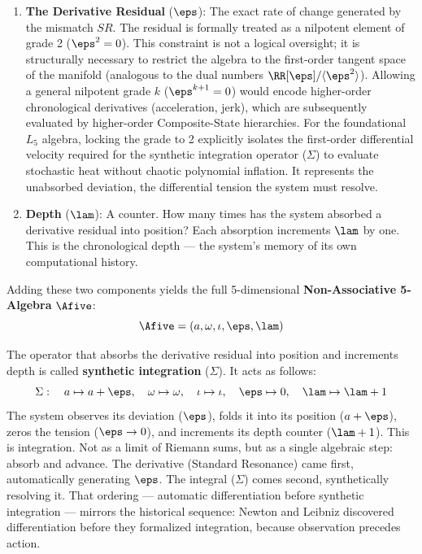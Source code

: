 \begin{enumerate}
\item \textbf{The Derivative Residual} ($\eps$): The exact rate of change generated by the mismatch $SR$. The residual is formally treated as a nilpotent element of grade 2 ($\eps^2 = 0$). This constraint is not a logical oversight; it is structurally necessary to restrict the algebra to the first-order tangent space of the manifold (analogous to the dual numbers $\RR[\eps]/\langle\eps^2\rangle$). Allowing a general nilpotent grade $k$ ($\eps^{k+1} = 0$) would encode higher-order chronological derivatives (acceleration, jerk), which are subsequently evaluated by higher-order Composite-State hierarchies. For the foundational $L_5$ algebra, locking the grade to 2 explicitly isolates the first-order differential velocity required for the synthetic integration operator ($\Sigma$) to evaluate stochastic heat without chaotic polynomial inflation. It represents the unabsorbed deviation, the differential tension the system must resolve. 
\item \textbf{Depth} ($\lam$): A counter. How many times has the system absorbed a derivative residual into position? Each absorption increments $\lam$ by one. This is the chronological depth --- the system's memory of its own computational history.
\end{enumerate}

Adding these two components yields the full 5-dimensional \textbf{Non-Associative 5-Algebra} $\Afive$:
$$\Afive = (a, \omega, \iota, \eps, \lam)$$

The operator that absorbs the derivative residual into position and increments depth is called \textbf{synthetic integration} ($\Sigma$). It acts as follows:
$$\Sigma: \quad a \mapsto a + \eps, \quad \omega \mapsto \omega, \quad \iota \mapsto \iota, \quad \eps \mapsto 0, \quad \lam \mapsto \lam + 1$$
The system observes its deviation ($\eps$), folds it into its position ($a + \eps$), zeros the tension ($\eps \to 0$), and increments its depth counter ($\lam + 1$). This is integration. Not as a limit of Riemann sums, but as a single algebraic step: absorb and advance. The derivative (Standard Resonance) came first, automatically generating $\eps$. The integral ($\Sigma$) comes second, synthetically resolving it. That ordering --- automatic differentiation before synthetic integration --- mirrors the historical sequence: Newton and Leibniz discovered differentiation before they formalized integration, because observation precedes action.

